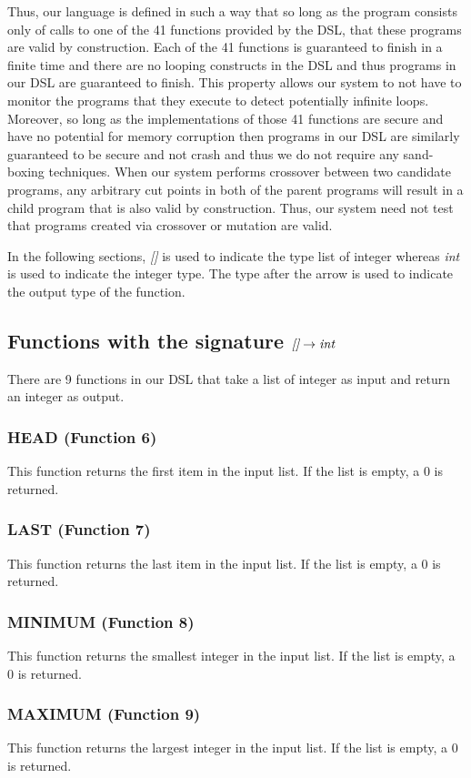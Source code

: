 Thus, our language is defined in such a way that so long as the program consists only of calls to one of the 41 functions provided by the DSL, that these programs are valid by construction. 
Each of the 41 functions is guaranteed to finish in a finite time and there are no looping constructs in the DSL and thus programs in our DSL are guaranteed to finish.  This property allows our system to not have to monitor the programs that they execute to detect potentially infinite loops.  Moreover, so long as the implementations of those 41 functions are secure and have no potential for memory corruption then programs in our DSL are similarly guaranteed to be secure and not crash and thus we do not require any sand-boxing techniques.  When our system performs crossover between two candidate programs, any arbitrary cut points in both of the parent programs will result in a child program that is also valid by construction.  Thus, our system need not test that programs created via crossover or mutation are valid.

In the following sections, \emph{[]} is used to indicate the type list of integer whereas \emph{int} is used to indicate the integer type.  The type after the arrow is used to indicate the output type of the function.

\subsection{Functions with the signature $\emph{[]} \rightarrow \emph{int}$}
There are 9 functions in our DSL that take a list of integer as input and return an integer as output.
\subsubsection{HEAD (Function 6)}
This function returns the first item in the input list.  If the list is empty, a 0 is returned.
\subsubsection{LAST (Function 7)}
This function returns the last item in the input list.  If the list is empty, a 0 is returned.
\subsubsection{MINIMUM (Function 8)}
This function returns the smallest integer in the input list.  If the list is empty, a 0 is returned.
\subsubsection{MAXIMUM (Function 9)}
This function returns the largest integer in the input list.  If the list is empty, a 0 is returned.
